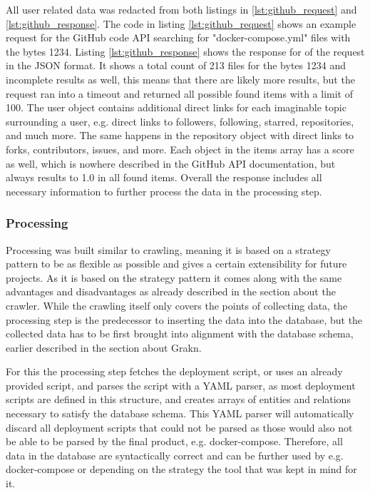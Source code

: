 All user related data was redacted from both listings in \ref{lst:github_request} and \ref{lst:github_response}.
The code in listing \ref{lst:github_request} shows an example request for the GitHub code API searching for "docker-compose.yml" files with the bytes 1234.
Listing \ref{lst:github_response} shows the response for of the request in the JSON format. It shows a total count of 213 files for the bytes 1234 and incomplete results as well, this means that there are likely more results, but the request ran into a timeout and returned all possible found items with a limit of 100. The user object contains additional direct links for each imaginable topic surrounding a user, e.g. direct links to followers, following, starred, repositories, and much more. The same happens in the repository object with direct links to forks, contributors, issues, and more. Each object in the items array has a score as well, which is nowhere described in the GitHub API documentation, but always results to 1.0 in all found items.
Overall the response includes all necessary information to further process the data in the processing step.

\subsubsection{Processing}
\label{sec:processing}
Processing was built similar to crawling, meaning it is based on a strategy pattern to be as flexible as possible and gives a certain extensibility for future projects. As it is based on the strategy pattern it comes along with the same advantages and disadvantages as already described in the section about the crawler.
While the crawling itself only covers the points of collecting data, the processing step is the predecessor to inserting the data into the database, but the collected data has to be first brought into alignment with the database schema, earlier described in the section about Grakn.

For this the processing step fetches the deployment script, or uses an already provided script, and parses the script with a YAML parser, as most deployment scripts are defined in this structure, and creates arrays of entities and relations necessary to satisfy the database schema. This YAML parser will automatically discard all deployment scripts that could not be parsed as those would also not be able to be parsed by the final product, e.g. docker-compose. Therefore, all data in the database are syntactically correct and can be further used by e.g. docker-compose or depending on the strategy the tool that was kept in mind for it.

